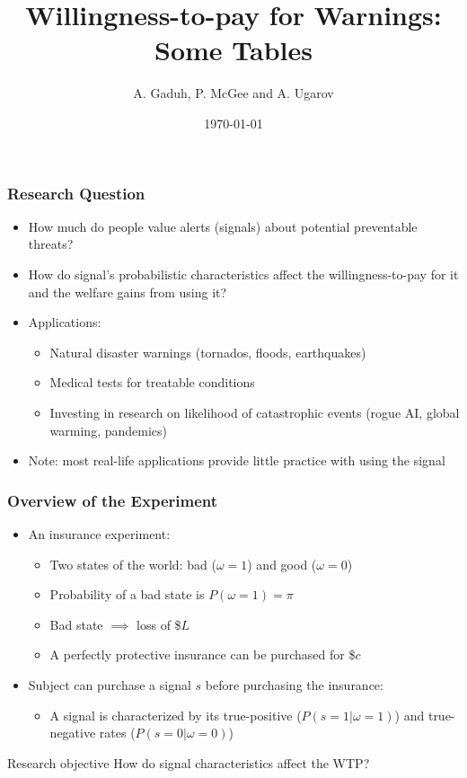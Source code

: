 \documentclass[11pt,hyperref={bookmarks=false}]{beamer}
\title[Willingness-to-pay for Warnings]{Willingness-to-pay for Warnings: Some Tables}
\author[A. Gaduh, P. McGee and A. Ugarov]{A. Gaduh, P. McGee and A. Ugarov}
\institute[]{}
\date{\today}
\newcommand\BackgroundPic{%
\put(0,0){%
\parbox[b][\paperheight]{\paperwidth}{%
\vfill
\centering
\vfill
}}}
\begin{document}

\begin{frame}
\titlepage
\end{frame}


\begin{frame}
\frametitle{Research Question}
\begin{itemize}
	\item How much do people value alerts (signals) about potential preventable threats?
	\item How do signal's probabilistic characteristics affect the willingness-to-pay for it and the welfare gains from using it?
	\item Applications:
	\begin{itemize}
		\item Natural disaster warnings (tornados, floods, earthquakes)
		\item Medical tests for treatable conditions
		\item Investing in research on likelihood of catastrophic events (rogue AI, global warming, pandemics)
	\end{itemize}
	\item Note: most real-life applications provide little practice with using the signal
\end{itemize}
\end{frame}


\begin{frame}
\frametitle{Overview of the Experiment}
\begin{itemize}
	\item An insurance experiment:
		\begin{itemize}
			\item Two states of the world: bad ($\omega=1$) and good ($\omega=0$)
			\item Probability of a bad state is $P (\omega=1) = \pi$
			\item Bad state $\implies$ loss of \$$L$
			\item A perfectly protective insurance can be purchased for \$$c$
		\end{itemize}
	\item Subject can purchase a signal $s$ before purchasing the insurance:
		\begin{itemize}
			\item A signal is characterized by its true-positive ($P(s=1|\omega=1)$) and true-negative rates ($P(s=0|\omega=0)$) 
		\end{itemize}
\end{itemize}

\vspace{1em}
\begin{block}{Research objective}
	How do signal characteristics affect the WTP?
\end{block}
\end{frame}
\end{document}
